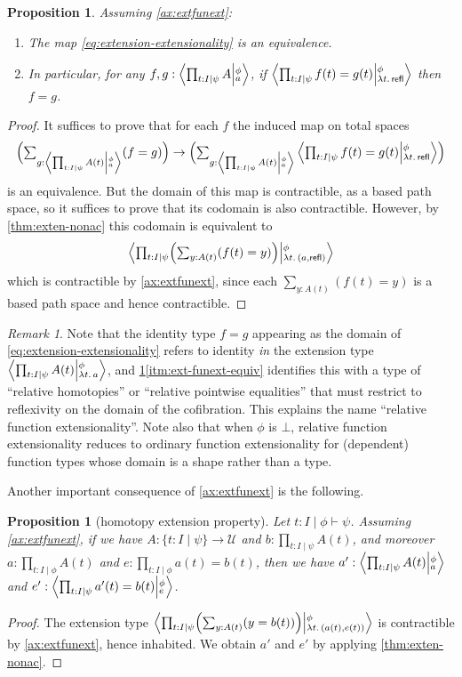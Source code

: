 \documentclass{amsart}
\theoremstyle{plain}
\newtheorem{prop}[thm]{Proposition}
\theoremstyle{definition}
\theoremstyle{remark}
\newtheorem{rmk}[thm]{Remark}
\numberwithin{equation}{section}
\newcommand{\tprod}{\textstyle\prod}
\newcommand{\tsum}{\textstyle\sum}
\newcommand{\exten}[4]{\left\langle\mathchoice{\textstyle\prod_{#1}}{\textstyle\prod_{#1}}{\scriptstyle\prod_{#1}}{\scriptscriptstyle\prod_{#1}} #2 \middle|^{#3}_{#4}\right\rangle}
\newcommand{\types}{\vdash}
\newcommand{\univtype}{\mathcal{U}}
\newcommand{\sh}[2]{\{#1\mid #2\}}
\newcommand{\refl}{\mathsf{refl}}
\newcommand{\lam}[1]{\lambda #1.\,}
\newcommand{\Parens}[1]{\Bigl(#1\Bigr)}
\begin{document}
\begin{prop}\label{thm:ext-funext}
  Assuming \cref{ax:extfunext}:
  \begin{enumerate}[label=(\roman*)]
  \item\label{itm:ext-funext-equiv} The map \eqref{eq:extension-extensionality} is an equivalence.
  \item\label{itm:ext-funext-naive}  In particular, for any $f,g:\exten{t:I \mid \psi}{A}{\phi}{a}$, if $\exten{t:I \mid \psi}{f(t)=g(t)}{\phi}{\lam{t}\refl}$ then $f=g$.
  \end{enumerate}
\end{prop}
\begin{proof}
  It suffices to prove that for each $f$ the induced map on total spaces
  \[ \Parens{\tsum_{g:\exten{t:I \mid \psi}{A(t)}{\phi}{a}} (f=g)} \to \Parens{\tsum_{g:\exten{t:I \mid \psi}{A(t)}{\phi}{a}} \exten{t:I \mid \psi}{f(t)=g(t)}{\phi}{\lam{t}\refl}}\]
  is an equivalence.
  But the domain of this map is contractible, as a based path space, so it suffices to prove that its codomain is also contractible.
  However, by \cref{thm:exten-nonac} this codomain is equivalent to
  \[ \exten{t:I\mid\psi}{\Parens{\tsum_{y:A(t)} (f(t) = y)}}{\phi}{\lam{t}(a,\refl)} \]
  which is contractible by \cref{ax:extfunext}, since each $\tsum_{y:A(t)} (f(t) = y)$ is a based path space and hence contractible.
\end{proof}

\begin{rmk}
Note that the identity type $f=g$ appearing as the domain of \eqref{eq:extension-extensionality} refers to identity \emph{in} the extension type $\exten{t:I \mid \psi}{A(t)}{\phi}{\lam{t}a}$, and \cref{thm:ext-funext}\ref{itm:ext-funext-equiv} identifies this with a type of ``relative homotopies'' or ``relative pointwise equalities'' that must restrict to reflexivity on the domain of the cofibration.
This explains the name ``relative function extensionality''.
Note also that when $\phi$ is $\bot$, relative function extensionality reduces to ordinary function extensionality for (dependent) function types whose domain is a shape rather than a type.
\end{rmk}

Another important consequence of \cref{ax:extfunext} is the following.

\begin{prop}[homotopy extension property]\label{thm:hep} Let $t:I \mid \phi\types\psi$.
  Assuming \cref{ax:extfunext},
  if we have $A:\sh{t:I}{\psi}\to\univtype$ and $b:\tprod_{t:I\mid\psi} A(t)$, and moreover $a:\tprod_{t:I\mid\phi} A(t)$ and $e:\tprod_{t:I\mid\phi} a(t) = b(t)$, then we have $a':\exten{t:I\mid\psi}{A(t)}{\phi}{a}$ and $e':\exten{t:I\mid\psi}{a'(t)=b(t)}{\phi}{e}$.
\end{prop}
\begin{proof}
  The extension type $\exten{t:I\mid\psi}{\Parens{\tsum_{y:A(t)} (y=b(t))}}{\phi}{\lam{t}(a(t),e(t))}$ is contractible by \cref{ax:extfunext}, hence inhabited.
  We obtain $a'$ and $e'$ by applying \cref{thm:exten-nonac}.
\end{proof}
\end{document}
